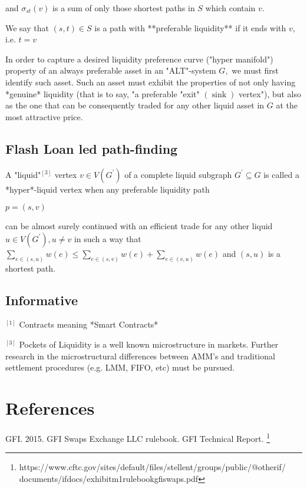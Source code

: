 {{{			
			and $\sigma_{s t}(v)$ is a sum of only those shortest paths in $S$ which contain $v .$
			
			We say that $(s, t) \in S$ is a path with **preferable liquidity** if it ends with $v,$ i.e. $t=v$
			
			
			In order to capture a desired liquidity preference curve ("hyper manifold") property of an always preferable asset in an 
			"ALT"-system $G,$ we must first identify such asset. Such an asset must exhibit the properties of not only having *genuine* liquidity (that is to say, "a preferable "exit" $(\operatorname{sink})$ vertex"), but also as the one that can be consequently traded for any other liquid asset in $G$ at the most attractive price.
			
			\subsection{Flash Loan led path-finding}
			
			A "liquid"$^[3]$ vertex $v \in V\left(G^{\prime}\right)$ of a complete liquid subgraph $G^{\prime} \subseteq G$ is called a *hyper*-liquid vertex when any preferable liquidity path 
			
			$p=(s, v)$ 
			
			can be almost surely continued with an efficient trade for any other liquid $u \in V\left(G^{\prime}\right), u \neq v$ in such a way that $\sum_{e \in(s, u)} w(e) \leq \sum_{e \in(s, v)} w(e)+\sum_{e \in(v, u)} w(e)$ and $(s, u)$ is
			a shortest path.
			
			
			\subsection{Informative}
			
			$^[1]$ Contracts meaning *Smart Contracts*
			
			$^[3]$ Pockets of Liquidity is a well known microstructure in markets. Further research in the microstructural differences between AMM's and traditional settlement procedures (e.g. LMM, FIFO, etc) must be pursued.
			
			
			
			\newpage
			
			\section{References}
			
			GFI. 2015. GFI Swaps Exchange LLC rulebook. GFI Technical Report.
			\footnote{https://www.cftc.gov/sites/default/files/stellent/groups/public/@otherif/
			documents/ifdocs/exhibitm1rulebookgfiswaps.pdf}
			
}}}
